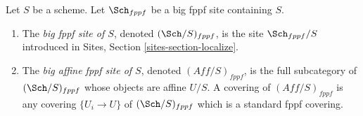 \begin{definition}
\label{definition-big-small-fppf}
Let $S$ be a scheme. Let $\Sch_{fppf}$ be a big fppf
site containing $S$.
\begin{enumerate}
\item The {\it big fppf site of $S$}, denoted
$(\Sch/S)_{fppf}$, is the site $\Sch_{fppf}/S$
introduced in Sites, Section \ref{sites-section-localize}.
\item The {\it big affine fppf site of $S$}, denoted
$(\textit{Aff}/S)_{fppf}$, is the full subcategory of
$(\Sch/S)_{fppf}$ whose objects are affine $U/S$.
A covering of $(\textit{Aff}/S)_{fppf}$ is any covering
$\{U_i \to U\}$ of $(\Sch/S)_{fppf}$ which is a
standard fppf covering.
\end{enumerate}
\end{definition}